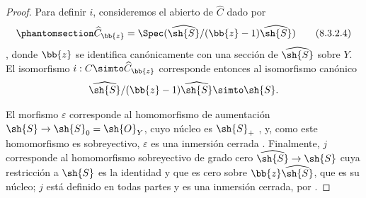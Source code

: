 \documentclass[oneside,10pt]{amsart}
\makeatletter
\newcommand{\ega@arrow}[2]{\mathchoice{#1}{#2}{#2}{#2}}
\renewcommand{\to}{\ega@arrow{\longrightarrow}{\rightarrow}}
\let\EGAOriginalLabel\label
\renewcommand{\label}[1]{\phantomsection\EGAOriginalLabel{#1}}
\makeatother
\begin{document}
\begin{proof}
Para definir $i$, consideremos el abierto de $\widehat{C}$ dado por
\[
\label{II.8.3.2.4}
  \widehat{C}_{\bb{z}} = \Spec(\widehat{\sh{S}}/(\bb{z}-1)\widehat{\sh{S}})
\tag{8.3.2.4}
\]
, donde $\bb{z}$ se identifica canónicamente con una sección de $\widehat{\sh{S}}$ sobre $Y$.
El isomorfismo $i: C\simto\widehat{C}_{\bb{z}}$ corresponde entonces al isomorfismo canónico 
\[
  \widehat{\sh{S}}/(\bb{z}-1)\widehat{\sh{S}} \simto \sh{S}.
\]

El morfismo $\varepsilon$ corresponde al homomorfismo de aumentación $\sh{S}\to\sh{S}_0=\sh{O}_Y$, cuyo núcleo es $\sh{S}_+$ , y, como este homomorfismo es sobreyectivo, $\varepsilon$ es una inmersión cerrada .
Finalmente, $j$ corresponde  al homomorfismo sobreyectivo de grado cero $\widehat{\sh{S}}\to\sh{S}$ cuya restricción a $\sh{S}$ es la identidad y que es cero sobre $\bb{z}\widehat{\sh{S}}$, que es su núcleo;
$j$ está definido en todas partes y es una inmersión cerrada, por .


\end{proof}
\end{document}

